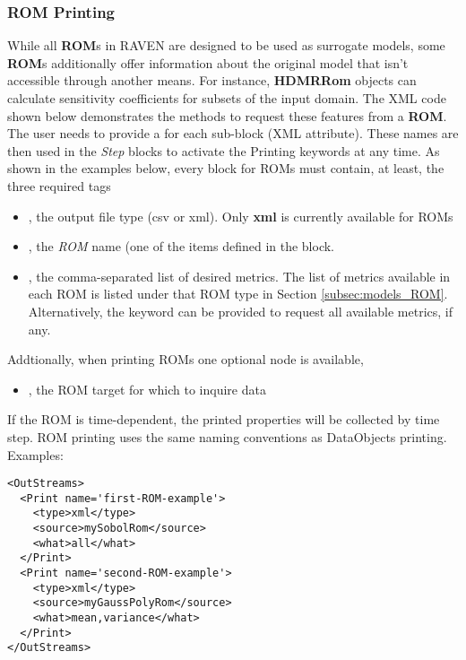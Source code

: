 \subsubsection{\textbf{ROM} Printing}
While all \textbf{ROM}s in RAVEN are designed to be used as surrogate models,
some \textbf{ROM}s additionally offer information about the original model that
isn't accessible through another means.  For instance, \textbf{HDMRRom} objects
can calculate sensitivity coefficients for subsets of the input domain.
%
The XML code shown below demonstrates the methods to request these features
from a \textbf{ROM}.
%
The user needs to provide a  for each sub-block (XML attribute).
%
These names are then used in the \textit{Step} blocks to activate the Printing keywords
at any time.
%
As shown in the examples below, every  block for ROMs must contain, at least, the
three required tags
\vspace{-5mm}
\begin{itemize}
  \itemsep0em
  \item {}, the output file type (csv or xml).
  \nb Only \textbf{xml} is currently available for ROMs
  \item {}, the \textit{ROM} name (one of the  items
  defined in the  block.
  \item {}, the comma-separated list of desired metrics.
  The list of metrics available in each ROM is listed under that ROM
  type in Section \ref{subsec:models_ROM}.  Alternatively, the
  keyword  can be provided to request all available metrics, if any.
\end{itemize}
\vspace{-5mm}
Addtionally, when printing ROMs one optional node is available,
\vspace{-5mm}
\begin{itemize}
  \itemsep0em
  \item {}, the ROM target for which to inquire data

\end{itemize}
\vspace{-5mm}
If the ROM is time-dependent, the printed properties will be collected by time step.
ROM printing uses the same naming conventions as DataObjects printing.
Examples:
\begin{lstlisting}[style=XML]
<OutStreams>
  <Print name='first-ROM-example'>
    <type>xml</type>
    <source>mySobolRom</source>
    <what>all</what>
  </Print>
  <Print name='second-ROM-example'>
    <type>xml</type>
    <source>myGaussPolyRom</source>
    <what>mean,variance</what>
  </Print>
</OutStreams>
\end{lstlisting}
%
%
